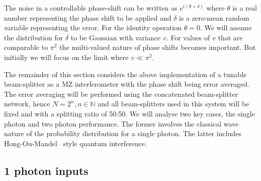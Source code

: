 \documentclass[aps,pra,twocolumn,superscriptaddress,numerical,floatfix]{revtex4-1}
\begin{document}
The noise in a controllable phase-shift can be written as $e^{i(\theta+\delta)}$ where $\theta$ is a real number representing the phase shift to be applied and $\delta$ is a zero-mean random variable representing the error.  For the identity operation $\theta=0$.  We will assume the distribution for $\delta$ to be Gaussian with variance $v$.  For values of $v$ that are comparable to $\pi^2$ the multi-valued nature of phase shifts becomes important.  But initially we will focus on the limit where $v \ll \pi^2$.

The remainder of this section considers the above implementation of a tunable beam-splitter as a MZ interferometer with the phase shift being error averaged. The error averaging will be performed using the concatenated beam-splitter network, hence $N=2^n, n \in \mathbb{N}$ and all beam-splitters used in this system will be fixed and with a splitting ratio of 50:50. We will analyse two key cases, the single photon and two photon performance.  The former involves the classical wave nature of the probability distribution for a single photon.  The latter includes Hong-Ou-Mandel~\cite{hom} style quantum interference.

\subsection{1 photon inputs \label{1 photon N arbitrary}}
\end{document}
